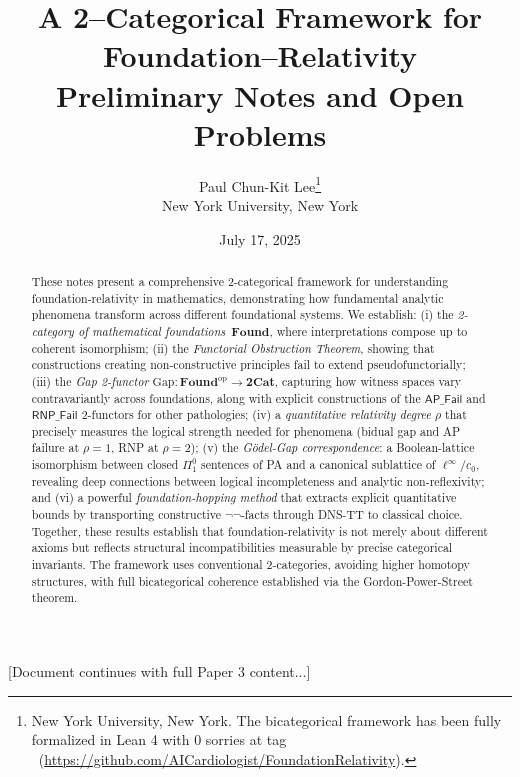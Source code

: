\documentclass[11pt]{article}
\title{A 2--Categorical Framework for Foundation--Relativity\\
  \large{Preliminary Notes and Open Problems}}
\author{Paul Chun-Kit Lee\thanks{New York University, New York. The bicategorical framework has been fully formalized in Lean 4 with 0 sorries at tag \leanRepoTag\ (\url{https://github.com/AICardiologist/FoundationRelativity}).}\\
  \small New York University, New York}
\date{July 17, 2025}
\theoremstyle{definition}
\theoremstyle{remark}
\begin{document}
\maketitle
\thispagestyle{empty}

\begin{abstract}
  These notes present a comprehensive 2-categorical framework for understanding
  foundation-relativity in mathematics, demonstrating how fundamental analytic
  phenomena transform across different foundational systems. We establish:
  (i) the \emph{2-category of mathematical foundations}~\(\mathbf{Found}\),
  where interpretations compose up to coherent isomorphism;
  (ii) the \emph{Functorial Obstruction Theorem}, showing that constructions
  creating non-constructive principles fail to extend pseudofunctorially;
  (iii) the \emph{Gap 2-functor}
  \(\mathrm{Gap}\colon\mathbf{Found}^{\mathrm{op}}\to\mathbf{2Cat}\),
  capturing how witness spaces vary contravariantly across foundations,
  along with explicit constructions of the \(\mathsf{AP\_Fail}\) and
  \(\mathsf{RNP\_Fail}\) 2-functors for other pathologies;
  (iv) a \emph{quantitative relativity degree} \(\rho\) that precisely
  measures the logical strength needed for phenomena (bidual gap and AP
  failure at \(\rho=1\), RNP at \(\rho=2\));
  (v) the \emph{Gödel-Gap correspondence}: a Boolean-lattice isomorphism 
  between closed \(\Pi^0_1\)
  sentences of PA and a canonical sublattice of \(\ell^\infty/c_0\),
  revealing deep connections between logical incompleteness and analytic
  non-reflexivity; and
  (vi) a powerful \emph{foundation-hopping method} that extracts explicit
  quantitative bounds by transporting constructive
  \(\neg\neg\)-facts
  through DNS-TT to classical choice. 
  Together, these results establish that foundation-relativity is not
  merely about different axioms but reflects structural incompatibilities
  measurable by precise categorical invariants. The framework uses conventional 2-categories, avoiding higher homotopy structures, with full bicategorical coherence established via the Gordon-Power-Street theorem.
\end{abstract}

[Document continues with full Paper 3 content...]
\end{document}

